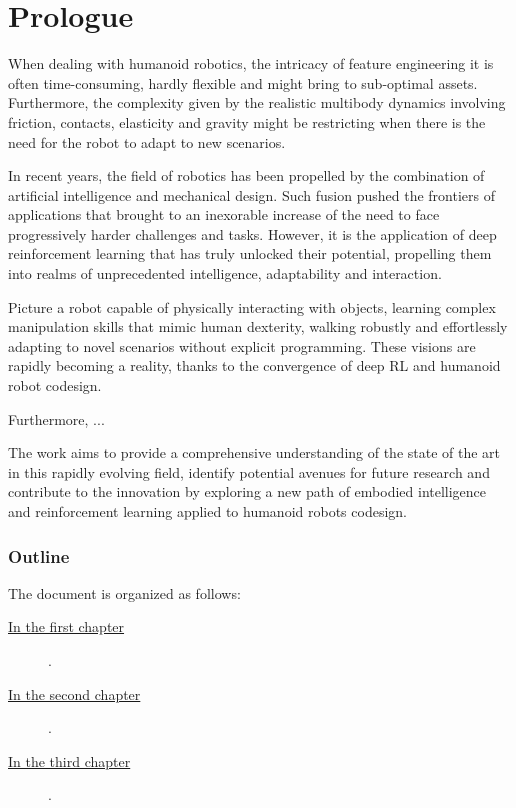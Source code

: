 \chapter*{Prologue}
\label{ch:prologue}

When dealing with humanoid robotics, the intricacy of feature engineering it is often time-consuming, hardly flexible and might bring to sub-optimal assets. Furthermore, the complexity given by the realistic multibody dynamics involving friction, contacts, elasticity and gravity might be restricting when there is the need for the robot to adapt to new scenarios.

In recent years, the field of robotics has been propelled by the combination of artificial intelligence and mechanical design. Such fusion pushed the frontiers of applications that brought to an inexorable increase of the need to face progressively harder challenges and tasks. However, it is the application of deep reinforcement learning that has truly unlocked their potential, propelling them into realms of unprecedented intelligence, adaptability and interaction. 

Picture a robot capable of physically interacting with objects, learning complex manipulation skills that mimic human dexterity, walking robustly and effortlessly adapting to novel scenarios without explicit programming. These visions are rapidly becoming a reality, thanks to the convergence of deep \ac{RL} and humanoid robot codesign.

Furthermore, ...

The work aims to provide a comprehensive understanding of the state of the art in this rapidly evolving field, identify potential avenues for future research and contribute to the innovation by exploring a new path of embodied intelligence and reinforcement learning applied to humanoid robots codesign.

\clearpage

\subsection*{Outline}
%
The document is organized as follows:
%
%
\begin{description}

\item[{\hyperref[chp:03-PhysicsSimulators]{In the first chapter}}] \lipsum[1].
\item[{\hyperref[chp:03-PhysicsSimulators]{In the second chapter}}] \lipsum[2].
\item[{\hyperref[chp:03-PhysicsSimulators]{In the third chapter}}] \lipsum[3].

\end{description}